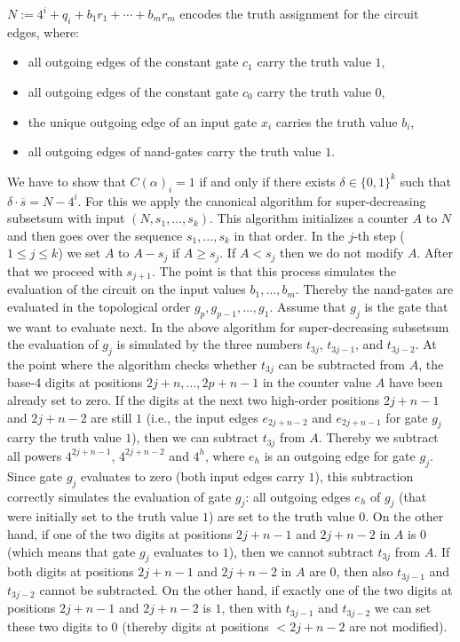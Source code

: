\documentclass[10pt,a4paper]{article}
\begin{document}
$N := 4^i + q_{i} + b_1 r_1 + \cdots + b_m r_m$ encodes the truth assignment for the circuit edges, where:
\begin{itemize}
\item all outgoing edges of the constant gate $c_1$ carry the truth value $1$, 
\item all outgoing edges of the constant gate $c_0$ carry the truth value $0$, 
\item the unique outgoing edge of an input gate $x_i$ carries the truth value $b_i$,
\item all outgoing edges of {\sf nand}-gates 
carry the truth value $1$.
\end{itemize}
We have to show that $C(\alpha)_i = 1$  if and only if there exists
$\delta \in \{0,1\}^k$ such that $\delta \cdot \overline{s} = N-4^i$.
For this we apply the canonical algorithm for super-decreasing subsetsum with input $(N,s_1,\ldots,s_k)$.
This algorithm initializes a counter $A$ to $N$ and then goes over the sequence $s_1,\ldots,s_k$ in that order.
In the $j$-th step ($1 \leq j \leq k$) we set $A$ to $A-s_j$ if $A \geq s_j$. If $A < s_j$ then we do not modify $A$.
After that we proceed with $s_{j+1}$. The point is that 
this process simulates the evaluation of the circuit on the input values $b_1, \ldots, b_m$. Thereby
the {\sf nand}-gates are evaluated in the topological order $g_p, g_{p-1}, \ldots, g_1$. Assume that $g_j$ is the gate that we 
want to evaluate next. In the above algorithm for super-decreasing subsetsum the evaluation of $g_j$ is simulated 
by the three numbers $t_{3j}$, $t_{3j-1}$, and $t_{3j-2}$. At the point where the algorithm checks whether $t_{3j}$ can 
be subtracted from $A$, the base-4 digits at positions $2j+n,\ldots, 2p+n-1$ in the counter value $A$ have been already set to zero. If the digits at the next two high-order 
positions $2j+n-1$ and $2j+n-2$ are still $1$ (i.e., the input edges $e_{2j+n-2}$ and $e_{2j+n-1}$ for gate
$g_j$ carry the truth value $1$), then we can subtract $t_{3j}$ from $A$. Thereby we subtract all powers
$4^{2j+n-1}$, $4^{2j+n-2}$ and
$4^h$, where $e_h$ is an outgoing edge for gate $g_j$. Since gate $g_j$ evaluates to zero (both input edges carry $1$), this subtraction
correctly simulates the evaluation of gate $g_j$: all outgoing edges $e_h$ of $g_j$ (that were initially set to the truth value $1$) are set to the 
truth value $0$. On the other hand, if one of the two digits at
positions $2j+n-1$ and $2j+n-2$ in $A$ is $0$ (which means that gate $g_j$ evaluates to $1$), then we 
cannot subtract $t_{3j}$ from $A$. If both digits at positions $2j+n-1$ and $2j+n-2$ in $A$ are $0$, then
also $t_{3j-1}$ and $t_{3j-2}$ cannot be subtracted. On the other hand, if exactly one of the two digits
at positions $2j+n-1$ and $2j+n-2$ is $1$, then with
$t_{3j-1}$ and $t_{3j-2}$ we can set  these two digits to $0$ (thereby digits at positions $< 2j+n-2$ are not modified).
\end{document}
